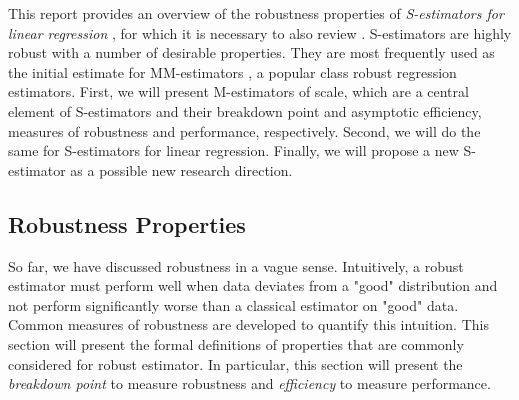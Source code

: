 This report provides an overview of the robustness properties of \textit{S-estimators for linear regression} \cite{rousseeuw1984robust}, for which it is necessary to also review  \cite{maronna2019robust}. S-estimators are highly robust with a number of desirable properties. They are most frequently used as the initial estimate for MM-estimators \cite{yohai1987high}, a popular class robust regression estimators. First, we will present M-estimators of scale, which are a central element of S-estimators and their breakdown point and asymptotic efficiency, measures of robustness and performance, respectively. Second, we will do the same for S-estimators for linear regression. Finally, we will propose a new S-estimator as a possible new research direction.


\subsection{Robustness Properties}

So far, we have discussed robustness in a vague sense. Intuitively, a robust estimator must perform well when data deviates from a "good" distribution and not perform significantly worse than a classical estimator on "good" data. Common measures of robustness are developed to quantify this intuition. This section will present the formal definitions of properties that are commonly considered for robust estimator. In particular, this section will present the \textit{breakdown point} to measure robustness and \textit{efficiency} to measure performance.

